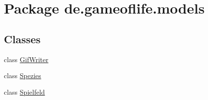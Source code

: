 \hypertarget{namespacede_1_1gameoflife_1_1models}{\section{Package de.\-gameoflife.\-models}
\label{namespacede_1_1gameoflife_1_1models}
}
\subsection*{Classes}
\begin{DoxyCompactItemize}
\item 
class \hyperlink{classde_1_1gameoflife_1_1models_1_1GifWriter}{Gif\-Writer}
\item 
class \hyperlink{classde_1_1gameoflife_1_1models_1_1Spezies}{Spezies}
\item 
class \hyperlink{classde_1_1gameoflife_1_1models_1_1Spielfeld}{Spielfeld}
\end{DoxyCompactItemize}
